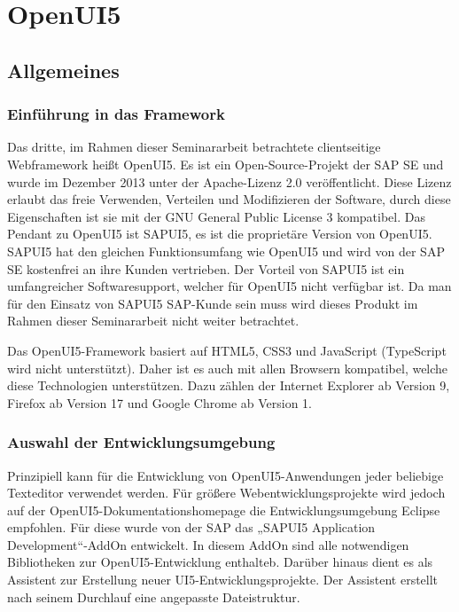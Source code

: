 
\chapter{OpenUI5}
\label{ch:openUI5}

\section{Allgemeines}

\subsection{Einführung in das Framework}\label{sec:oEinf}

Das dritte, im Rahmen dieser Seminararbeit betrachtete clientseitige Webframework heißt OpenUI5. Es ist ein Open-Source-Projekt der SAP SE und wurde im Dezember 2013 unter der Apache-Lizenz 2.0 veröffentlicht. Diese Lizenz erlaubt das freie Verwenden, Verteilen und Modifizieren der Software, durch diese Eigenschaften ist sie mit der GNU General Public License 3 kompatibel. Das Pendant zu OpenUI5 ist SAPUI5, es ist die proprietäre Version von OpenUI5. SAPUI5 hat den gleichen Funktionsumfang wie OpenUI5 und wird von der SAP SE kostenfrei an ihre Kunden vertrieben. Der Vorteil von SAPUI5 ist ein umfangreicher Softwaresupport, welcher für OpenUI5 nicht verfügbar ist. Da man für den Einsatz von SAPUI5 SAP-Kunde sein muss wird dieses Produkt im Rahmen dieser Seminararbeit nicht weiter betrachtet.

Das OpenUI5-Framework basiert auf HTML5, CSS3 und JavaScript (TypeScript wird nicht unterstützt). Daher ist es auch mit allen Browsern kompatibel, welche diese Technologien unterstützen. Dazu zählen der Internet Explorer ab Version 9, Firefox ab Version 17 und Google Chrome ab Version 1.\autocites[vgl.][6]{SAP2013}

\subsection{Auswahl der Entwicklungsumgebung}\label{sec:oEntw}

Prinzipiell kann für die Entwicklung von OpenUI5-Anwendungen jeder beliebige Texteditor verwendet werden. Für größere Webentwicklungsprojekte wird jedoch auf der OpenUI5-Dokumentationshomepage die Entwicklungsumgebung Eclipse empfohlen. Für diese wurde von der SAP das „SAPUI5 Application Development“-AddOn entwickelt. In diesem AddOn sind alle notwendigen Bibliotheken zur OpenUI5-Entwicklung enthalteb. Darüber hinaus dient es als Assistent zur Erstellung neuer UI5-Entwicklungsprojekte. Der Assistent erstellt nach seinem Durchlauf eine angepasste Dateistruktur. 

